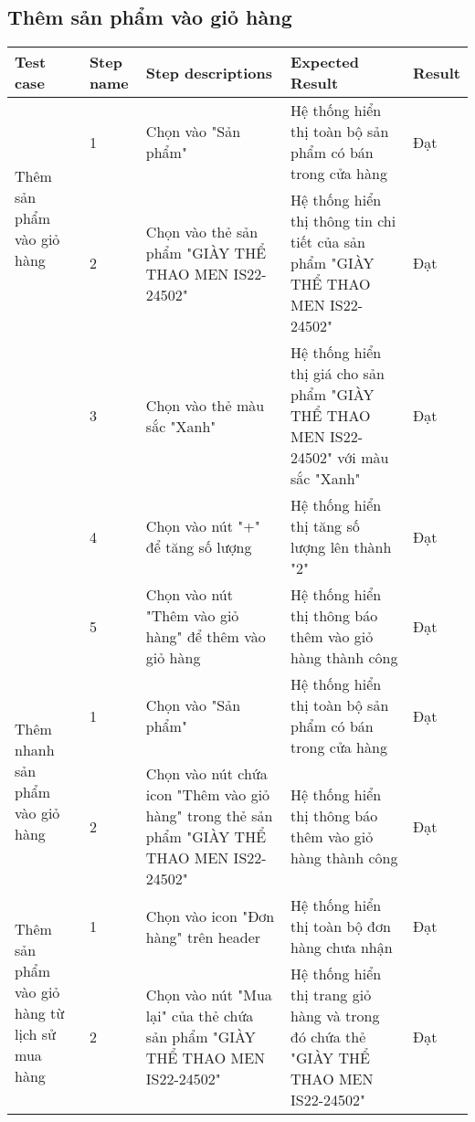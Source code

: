 \subsection{Thêm sản phẩm vào giỏ hàng}
{
    \setlength\extrarowheight{6pt}
    \begin{longtable}{| p{2.5cm}| p{1cm}| p{5.5cm}| p{4.5cm} | p{1.5cm} |}
        \hline
        \textbf{Test case} & \textbf{Step name} & \textbf{Step descriptions} & \textbf{Expected Result} & \textbf{Result} \\
        \hline
        \multirow[t]{2}{2.5cm}{Thêm sản phẩm vào giỏ hàng} & 
        1 & 
        Chọn vào "Sản phẩm" & 
        Hệ thống hiển thị toàn bộ sản phẩm có bán trong cửa hàng & 
        Đạt \\
        \cline{2-5}
         & 2 & 
         Chọn vào thẻ sản phẩm "GIÀY THỂ THAO MEN IS22-24502" & 
         Hệ thống hiển thị thông tin chi tiết của sản phẩm "GIÀY THỂ THAO MEN IS22-24502" & 
         Đạt \\
        \cline{2-5}
         & 3 & 
         Chọn vào thẻ màu sắc "Xanh" & 
         Hệ thống hiển thị giá cho sản phẩm "GIÀY THỂ THAO MEN IS22-24502" với màu sắc "Xanh" & 
         Đạt \\
        \cline{2-5}
         & 4 & 
         Chọn vào nút "+" để tăng số lượng & 
         Hệ thống hiển thị tăng số lượng lên thành "2" & 
         Đạt \\
        \cline{2-5}
         & 5 & 
         Chọn vào nút "Thêm vào giỏ hàng" để thêm vào giỏ hàng & 
         Hệ thống hiển thị thông báo thêm vào giỏ hàng thành công & 
         Đạt \\
         \hline
        \multirow[t]{2}{2.5cm}{Thêm nhanh sản phẩm vào giỏ hàng} & 
        1 & 
        Chọn vào "Sản phẩm" & 
        Hệ thống hiển thị toàn bộ sản phẩm có bán trong cửa hàng & 
        Đạt \\
        \cline{2-5}
         & 2 & 
         Chọn vào nút chứa icon "Thêm vào giỏ hàng" trong thẻ sản phẩm "GIÀY THỂ THAO MEN IS22-24502" & 
         Hệ thống hiển thị thông báo thêm vào giỏ hàng thành công & 
         Đạt \\
         \hline
        \multirow[t]{2}{2.5cm}{Thêm sản phẩm vào giỏ hàng từ lịch sử mua hàng} & 
        1 & 
        Chọn vào icon "Đơn hàng" trên header & 
        Hệ thống hiển thị toàn bộ đơn hàng chưa nhận & 
        Đạt \\
        \cline{2-5}
         & 2 & 
         Chọn vào nút "Mua lại" của thẻ chứa sản phẩm "GIÀY THỂ THAO MEN IS22-24502" & 
         Hệ thống hiển thị trang giỏ hàng và trong đó chứa thẻ "GIÀY THỂ THAO MEN IS22-24502" & 
         Đạt \\
         \hline
    \end{longtable}
}

